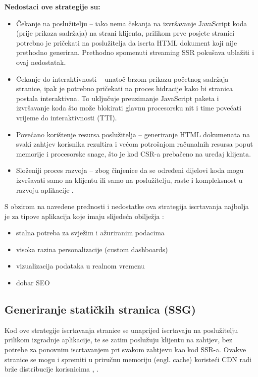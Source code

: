 \bigskip

\textbf{Nedostaci ove strategije su:}

\begin{itemize}
    \item Čekanje na poslužitelju – iako nema čekanja na izvršavanje JavaScript ko\-da (prije prikaza sadržaja) na strani klijenta, prilikom prve posjete stranici potrebno je pričekati na poslužitelja da iscrta HTML dokument koji nije prethodno generiran. Prethodno spomenuti streaming SSR pokušava ublažiti i ovaj nedostatak.
    \item Čekanje do interaktivnosti – unatoč brzom prikazu početnog sadržaja stranice, ipak je potrebno pričekati na proces hidracije kako bi stranica postala interaktivna. To uključuje preuzimanje JavaScript paketa i izvršavanje koda što može blokirati glavnu procesorsku nit i time povećati vrijeme do interaktivnosti (TTI).
    \item Povećano korištenje resursa poslužitelja – generiranje HTML dokumenata na svaki zahtjev korisnika rezultira i većom potrošnjom računalnih resursa poput memorije i procesorske snage, što je kod CSR-a prebačeno na uređaj klijenta.
    \item Složeniji proces razvoja – zbog činjenice da se određeni dijelovi koda mogu izvršavati samo na klijentu ili samo na poslužitelju, raste i kompleksnost u razvoju aplikacije \cite{beran2023usporedba}.
\end{itemize}

S obzirom na navedene prednosti i nedostatke ova strategija iscrtavanja najbolja je za tipove aplikacija koje imaju slijedeća obilježja \cite{moore2024rendering}:
\begin{itemize}
    \item stalna potreba za svježim i ažuriranim podacima
    \item visoka razina personalizacije (custom dashboards)
    \item vizualizacija podataka u realnom vremenu
    \item dobar SEO
\end{itemize}

\subsection{Generiranje statičkih stranica (SSG)}

Kod ove strategije iscrtavanja stranice se unaprijed iscrtavaju na poslužitelju prilikom izgradnje aplikacije, te se zatim poslužuju klijentu na zahtjev, bez potrebe za ponovnim iscrtavanjem pri svakom zahtjevu kao kod SSR-a. Ovakve stranice se mogu i spremiti u priručnu memoriju (engl. cache) koristeći CDN radi brže distribucije korisnicima \cite{nextjsssg}, \cite{sanityssg}.

